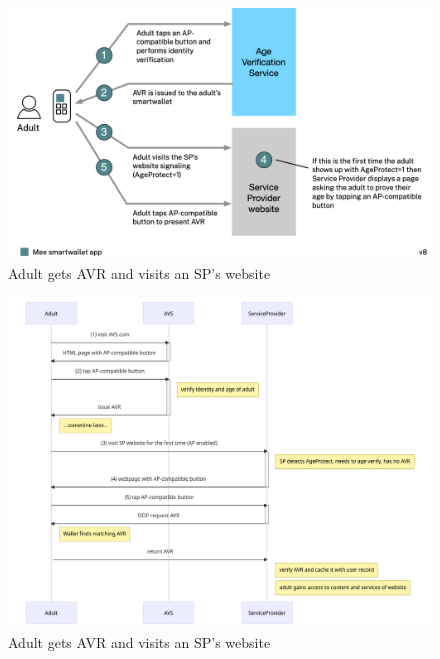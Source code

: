 \documentclass[11pt, oneside]{article}   	%
\begin{document}
\begin{figure}
	\includegraphics[width=\textwidth]{./images/adult.png}
	\caption{Adult gets AVR and visits an SP's website}
	\label{fig:adult}
\end{figure}

\begin{figure}
	\includegraphics[width=\textwidth]{./images/adult-sequence.png}
	\caption{Adult gets AVR and visits an SP's website}
	\label{fig:adult-seq}
\end{figure}

\end{document}
